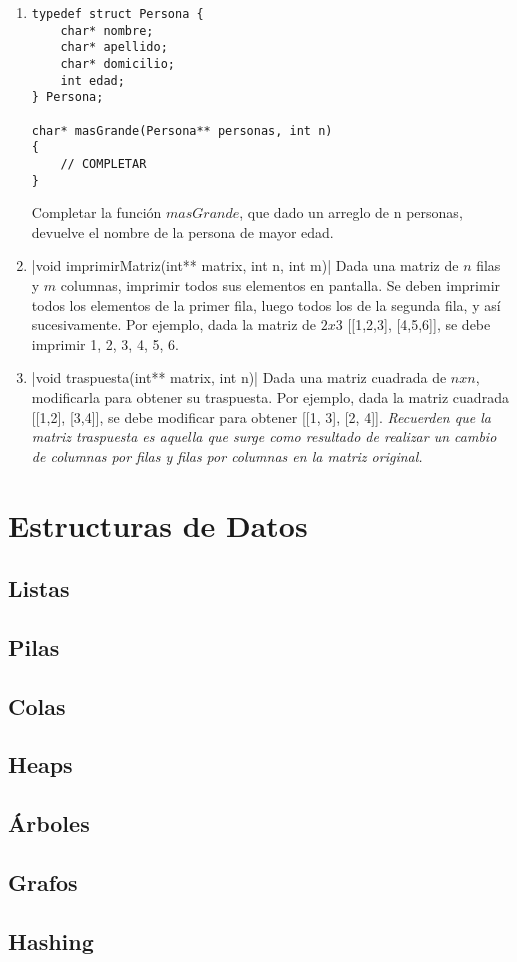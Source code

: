 \documentclass[titlepage,oneside]{book}
\begin{document}
\begin{enumerate}

    \item\begin{verbatim}
typedef struct Persona {
    char* nombre;
    char* apellido;
    char* domicilio;
    int edad;
} Persona;

char* masGrande(Persona** personas, int n)
{
    // COMPLETAR
}
    \end{verbatim}

    Completar la función $masGrande$, que dado un arreglo de n personas, devuelve el nombre de la persona de mayor edad.

    \item {}|void imprimirMatriz(int** matrix, int n, int m)|
    Dada una matriz de $n$ filas y $m$ columnas, imprimir todos sus elementos en pantalla. Se deben imprimir todos los elementos de la primer fila, luego todos los de la segunda fila, y así sucesivamente. Por ejemplo, dada la matriz de $2x3$ [[1,2,3], [4,5,6]], se debe imprimir 1, 2, 3, 4, 5, 6.
    
    \item {}|void traspuesta(int** matrix, int n)|
    Dada una matriz cuadrada de $nxn$, modificarla para obtener su traspuesta. Por ejemplo, dada la matriz cuadrada [[1,2], [3,4]], se debe modificar para obtener [[1, 3], [2, 4]]. \textit{Recuerden que la matriz traspuesta es aquella que surge como resultado de realizar un cambio de columnas por filas y filas por columnas en la matriz original.}
    
\end{enumerate}


\part{Estructuras de Datos}
\chapter{Listas}

\chapter{Pilas}

\chapter{Colas}

\chapter{Heaps}

\chapter{Árboles}

\chapter{Grafos}

\chapter{Hashing}

\printbibliography{}
\end{document}
